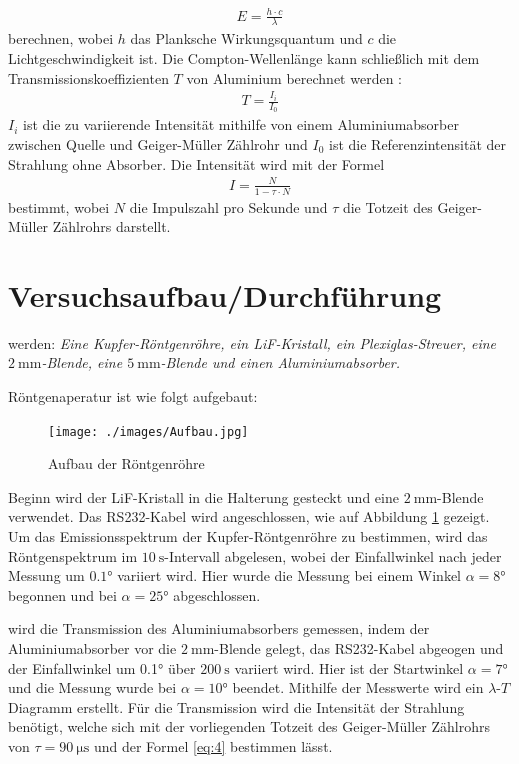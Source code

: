     \begin{align}
        E = \frac{h \cdot c}{\lambda} \label{eq:3}
    \end{align}
    berechnen, wobei $h$ das Planksche Wirkungsquantum und $c$ die Lichtgeschwindigkeit ist. Die Compton-Wellenlänge kann schließlich mit dem Transmissionskoeffizienten $T$ von
    Aluminium berechnet werden \cite{V603}:
    \begin{align}
        T = \frac{I_i}{I_0} \label{eq:T}
    \end{align}
    $I_i$ ist die zu variierende Intensität mithilfe von einem Aluminiumabsorber zwischen Quelle und Geiger-Müller Zählrohr und $I_0$ ist die Referenzintensität der Strahlung ohne Absorber. 
    Die Intensität wird mit der Formel 
    \begin{align}
        I = \frac{N}{1- \tau \cdot N} \label{eq:4}
    \end{align}
    bestimmt, wobei $N$ die Impulszahl pro Sekunde und $\tau$ die Totzeit des Geiger-Müller Zählrohrs darstellt.

\section{Versuchsaufbau/Durchführung}
    \justifying werden: \textit{Eine Kupfer-Röntgenröhre, ein LiF-Kristall, ein Plexiglas-Streuer, eine $\SI{2}{\milli\meter}$-Blende, eine $\SI{5}
    {\milli\meter}$-Blende und einen Aluminiumabsorber.}

    \justifying Röntgenaperatur ist wie folgt aufgebaut:
    \begin{figure}
        \centering
        \texttt{[image: ./images/Aufbau.jpg]}
        \caption{Aufbau der Röntgenröhre \cite{V603}}
        \label{fig:1}
    \end{figure}

    \justifying Beginn wird der LiF-Kristall in die Halterung gesteckt und eine $\SI{2}{\milli\meter}$-Blende verwendet. Das RS232-Kabel wird angeschlossen, wie auf
    Abbildung \ref{fig:1} gezeigt. Um das Emissionsspektrum der Kupfer-Röntgenröhre 
    zu bestimmen, wird das Röntgenspektrum im $\SI{10}{\second}$-Intervall abgelesen, wobei der Einfallwinkel nach jeder Messung um $0.1°$ variiert wird.
    Hier wurde die Messung bei einem Winkel $\alpha = 8°$ begonnen und bei $\alpha = 25°$ abgeschlossen. 

    \justifying wird die Transmission des Aluminiumabsorbers gemessen, indem der Aluminiumabsorber vor die $\SI{2}{\milli\meter}$-Blende gelegt, das RS232-Kabel
    abgeogen und der Einfallwinkel um 0.1° über $\SI{200}{\second}$ variiert wird. Hier ist der Startwinkel $\alpha = 7°$ und die Messung wurde bei $\alpha = 10°$ beendet. 
    Mithilfe der Messwerte wird ein $\lambda$-$T$ Diagramm erstellt. Für die Transmission wird die Intensität der Strahlung benötigt, welche sich mit der vorliegenden
    Totzeit des Geiger-Müller Zählrohrs von $\tau = \SI{90}{\micro\second}$ und der Formel \eqref{eq:4} bestimmen lässt. 

